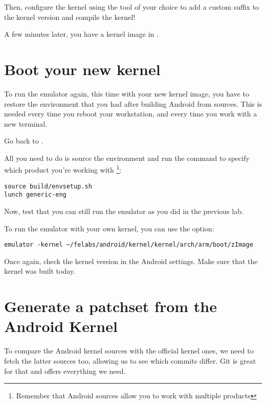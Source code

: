 
Then, configure the kernel using the tool of your choice to add a custom suffix
to the kernel version and compile the kernel!


A few minutes later, you have a kernel image in .

\section{Boot your new kernel}

To run the emulator again, this time with your new kernel image, you
have to restore the environment that you had after building Android from
sources. This is needed every time you reboot your workstation, and every time
you work with a new terminal.

Go back to .

All you need to do is source the environment and run the 
command to specify which product you're working with
\footnote{Remember that Android sources allow you to work with
multiple products}:

\begin{verbatim}
source build/envsetup.sh
lunch generic-eng
\end{verbatim}

Now, test that you can still run the emulator as you did in the
previous lab.

To run the emulator with your own kernel, you can use the 
option:

\begin{verbatim}
emulator -kernel ~/felabs/android/kernel/kernel/arch/arm/boot/zImage
\end{verbatim}

Once again, check the kernel version in the Android settings. Make sure
that the kernel was built today.

\section{Generate a patchset from the Android Kernel}

To compare the Android kernel sources with the official kernel ones,
we need to fetch the latter sources too, allowing us to see which 
commits differ. Git is great for that and offers everything we need.

